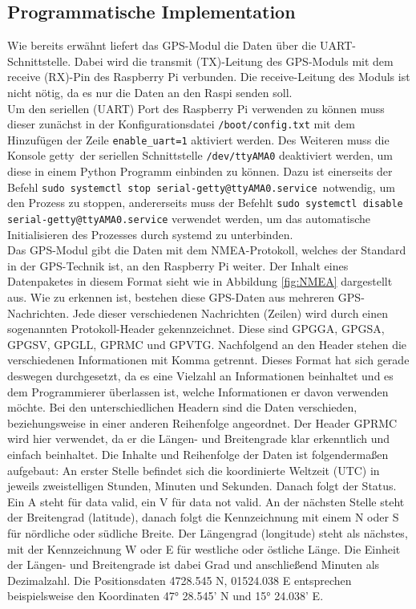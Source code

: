 \subsection{Programmatische Implementation}
\label{subsec:GPSprogram}
Wie bereits erwähnt liefert das GPS-Modul die Daten über die UART-Schnittstelle. Dabei wird die transmit (TX)-Leitung des GPS-Moduls mit dem receive (RX)-Pin des Raspberry Pi verbunden. Die receive-Leitung des Moduls ist nicht nötig, da es nur die Daten an den \ac{Raspi} senden soll.\\
Um den seriellen (\ac{UART}) Port des Raspberry Pi verwenden zu können muss dieser zunächst in der Konfigurationsdatei  \verb|/boot/config.txt| mit dem Hinzufügen der Zeile \verb|enable_uart=1| aktiviert werden. Des Weiteren muss die Konsole \glqq getty\grqq\ der seriellen Schnittstelle \verb|/dev/ttyAMA0| deaktiviert werden, um diese in einem Python Programm einbinden zu können. Dazu ist einerseits der Befehl \verb|sudo systemctl stop serial-getty@ttyAMA0.service|\ notwendig, um den Prozess zu stoppen, andererseits muss der Befehlt \verb|sudo systemctl disable serial-getty@ttyAMA0.service| verwendet werden, um das automatische Initialisieren des Prozesses durch systemd zu unterbinden.\\
Das \ac{GPS}-Modul gibt die Daten mit dem \ac{NMEA}-Protokoll, welches der Standard in der GPS-Technik ist, an den Raspberry Pi weiter. Der Inhalt eines Datenpaketes in diesem Format sieht wie in Abbildung \ref{fig:NMEA} dargestellt aus. Wie zu erkennen ist, bestehen diese \ac{GPS}-Daten aus mehreren \ac{GPS}-Nachrichten. Jede dieser verschiedenen Nachrichten (Zeilen) wird durch einen sogenannten Protokoll-Header gekennzeichnet. Diese sind GPGGA, GPGSA, GPGSV, GPGLL, GPRMC und GPVTG. Nachfolgend an den Header stehen die verschiedenen Informationen mit Komma getrennt. Dieses Format hat sich gerade deswegen durchgesetzt, da es eine Vielzahl an Informationen beinhaltet und es dem Programmierer überlassen ist, welche Informationen er davon verwenden möchte. Bei den unterschiedlichen Headern sind die Daten verschieden, beziehungsweise in einer anderen Reihenfolge angeordnet. Der Header GPRMC wird hier verwendet, da er die Längen- und Breitengrade klar erkenntlich und einfach beinhaltet. Die Inhalte und Reihenfolge der Daten ist folgendermaßen aufgebaut: An erster Stelle befindet sich die koordinierte Weltzeit (UTC) in jeweils zweistelligen Stunden, Minuten und Sekunden. Danach folgt der Status. Ein A steht für \glqq data valid\grqq , ein V für \glqq data not valid\grqq . An der nächsten Stelle steht der Breitengrad (latitude), danach folgt die Kennzeichnung mit einem N oder S für \glqq nördliche oder südliche Breite\grqq . Der Längengrad (longitude) steht als nächstes, mit der Kennzeichnung W oder E für \glqq westliche oder östliche Länge\grqq . Die Einheit der Längen- und Breitengrade ist dabei Grad und anschließend Minuten als Dezimalzahl. Die Positionsdaten 4728.545 N, 01524.038 E entsprechen beispielsweise den Koordinaten 47° 28.545' N und 15° 24.038' E.

